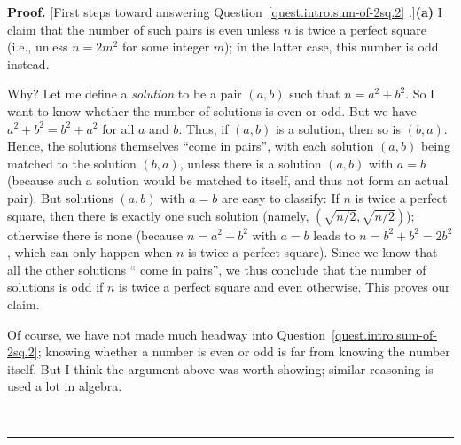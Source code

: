\documentclass[numbers=enddot,12pt,final,onecolumn,notitlepage]{scrartcl}%
\numberwithin{exer}{subsection}
\theoremstyle{definition}
\newenvironment{proof}[1][Proof]{\noindent\textbf{#1.} }{\ \rule{0.5em}{0.5em}}
\begin{document}
\begin{proof}
[First steps toward answering Question~\ref{quest.intro.sum-of-2sq.2}%
.]\textbf{(a)} I claim that the number of such pairs is even unless $n$ is
twice a perfect square (i.e., unless $n = 2m^{2}$ for some integer $m$); in
the latter case, this number is odd instead.

Why? Let me define a \textit{solution} to be a pair $\left(  a,b\right)  $
such that $n=a^{2}+b^{2}$. So I want to know whether the number of solutions
is even or odd. But we have $a^{2}+b^{2}=b^{2}+a^{2}$ for all $a$ and $b$.
Thus, if $\left(  a,b\right)  $ is a solution, then so is $\left(  b,a\right)
$. Hence, the solutions themselves \textquotedblleft come in
pairs\textquotedblright, with each solution $\left(  a,b\right)  $ being
matched to the solution $\left(  b,a\right)  $, unless there is a solution
$\left(  a,b\right)  $ with $a=b$ (because such a solution would be matched to
itself, and thus not form an actual pair). But solutions $\left(  a,b\right)
$ with $a=b$ are easy to classify: If $n$ is twice a perfect square, then
there is exactly one such solution (namely, $\left(  \sqrt{n/2},\sqrt
{n/2}\right)  $); otherwise there is none (because $n=a^{2}+b^{2}$ with $a=b$
leads to $n=b^{2}+b^{2}=2b^{2}$, which can only happen when $n$ is twice a
perfect square). Since we know that all the other solutions \textquotedblleft
come in pairs\textquotedblright, we thus conclude that the number of solutions
is odd if $n$ is twice a perfect square and even otherwise. This proves our claim.

Of course, we have not made much headway into
Question~\ref{quest.intro.sum-of-2sq.2}; knowing whether a number is even or
odd is far from knowing the number itself. But I think the argument above was
worth showing; similar reasoning is used a lot in algebra.


\end{proof}
\end{document}
